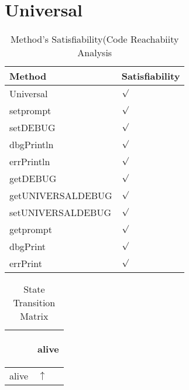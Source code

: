 \documentclass[10pt]{article}
\begin{document}
\section{{\color{Fuchsia}Universal}}
\label{Universal}
\begin{longtable}{|l|l|}
\caption{Method's Satisfiability(Code Reachabiity Analysis}\\
\hline
Method & Satisfiability\\
\hline
Universal&{\color{blue}$\surd$}\\
\hline
setprompt&{\color{blue}$\surd$}\\
\hline
setDEBUG&{\color{blue}$\surd$}\\
\hline
dbgPrintln&{\color{blue}$\surd$}\\
\hline
errPrintln&{\color{blue}$\surd$}\\
\hline
getDEBUG&{\color{blue}$\surd$}\\
\hline
getUNIVERSALDEBUG&{\color{blue}$\surd$}\\
\hline
setUNIVERSALDEBUG&{\color{blue}$\surd$}\\
\hline
getprompt&{\color{blue}$\surd$}\\
\hline
dbgPrint&{\color{blue}$\surd$}\\
\hline
errPrint&{\color{blue}$\surd$}\\
\hline
\end{longtable}
\begin{longtable}{|l|l|}
\caption{State Transition Matrix}\\
\hline
&\begin{sideways}alive\end{sideways}\\
\hline
alive&{\color{blue}$\uparrow$}\\
\hline
\end{longtable}
\end{document}
